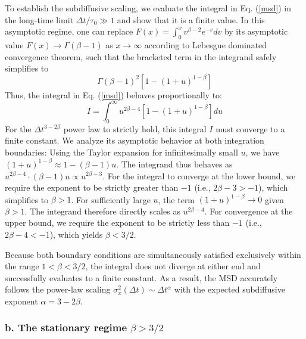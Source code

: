 \documentclass[aps, prl, longbibliography, linenumbers, superscriptaddress]{revtex4-2}
\begin{document}
{To establish the subdiffusive scaling, we evaluate the integral in Eq. (\ref{msd}) in the long-time limit $\Delta t / \tau_0 \gg 1$ and show that it is a finite value. In this asymptotic regime, one can replace $F(x) = \int_0^x v^{\beta-2} e^{-v} dv$ by its asymptotic value $F(x) \to \Gamma(\beta-1)$ as $x \to \infty$ according to Lebesgue dominated convergence theorem, such that the bracketed term in the integrand safely simplifies to
\begin{equation}
\Gamma(\beta-1)^2 \left[ 1 - (1+u)^{1-\beta} \right] 
\end{equation}
Thus, the integral in Eq. (\ref{msd}) behaves proportionally to:
\begin{equation}
I = \int_0^\infty u^{2\beta-4} \left[ 1 - (1+u)^{1-\beta} \right] du 
\end{equation}
For the $\Delta t^{3-2\beta}$ power law to strictly hold, this integral $I$ must converge to a finite constant. We analyze its asymptotic behavior at both integration boundaries: Using the Taylor expansion for infinitesimally small $u$, we have $(1+u)^{1-\beta} \approx 1 - (\beta-1)u$. The integrand thus behaves as $u^{2\beta-4} \cdot (\beta-1)u \propto u^{2\beta-3}$. For the integral to converge at the lower bound, we require the exponent to be strictly greater than $-1$ (i.e., $2\beta-3 > -1$), which simplifies to $\beta > 1$. For sufficiently large $u$, the term $(1+u)^{1-\beta} \to 0$ given $\beta > 1$. The integrand therefore directly scales as $u^{2\beta-4}$. For convergence at the upper bound, we require the exponent to be strictly less than $-1$ (i.e., $2\beta-4 < -1$), which yields $\beta < 3/2$.

Because both boundary conditions are simultaneously satisfied exclusively within the range $1 < \beta < 3/2$, the integral does not diverge at either end and successfully evaluates to a finite constant. As a result, the MSD accurately follows the power-law scaling $\sigma_x^2(\Delta t) \sim \Delta t^\alpha$ with the expected subdiffusive exponent $\alpha = 3 - 2\beta$.

\subsubsection{b. The stationary regime $\beta > 3/2$}

}
\end{document}
